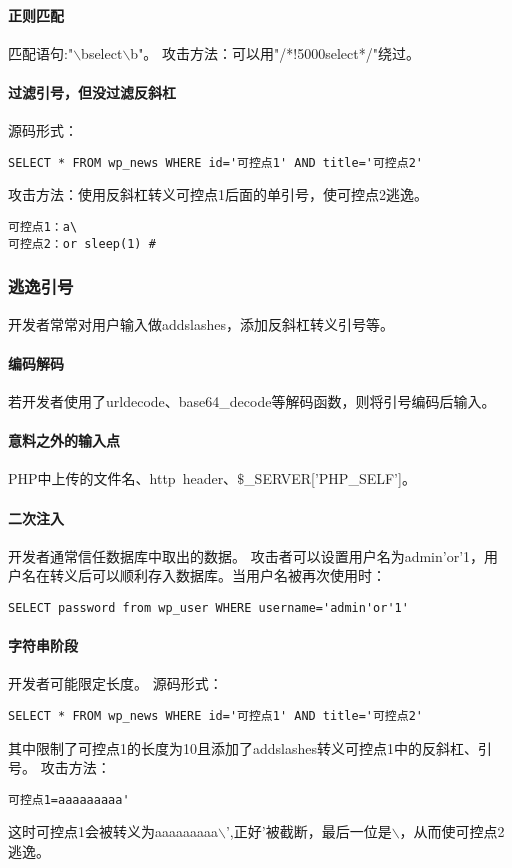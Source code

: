 \paragraph*{正则匹配}
匹配语句:"$\backslash$bselect$\backslash$b"。
攻击方法：可以用"/*!5000select*/"绕过。

\paragraph*{过滤引号，但没过滤反斜杠}
源码形式：
\begin{lstlisting}
SELECT * FROM wp_news WHERE id='可控点1' AND title='可控点2'
\end{lstlisting}
攻击方法：使用反斜杠转义可控点1后面的单引号，使可控点2逃逸。
\begin{lstlisting}
可控点1：a\
可控点2：or sleep(1) #
\end{lstlisting}

\subsubsection*{逃逸引号}
开发者常常对用户输入做addslashes，添加反斜杠转义引号等。

\paragraph*{编码解码}
若开发者使用了urldecode、base64\_decode等解码函数，则将引号编码后输入。

\paragraph*{意料之外的输入点}
PHP中上传的文件名、http\ header、$\$$\_SERVER['PHP\_SELF']。

\paragraph*{二次注入}
开发者通常信任数据库中取出的数据。
攻击者可以设置用户名为admin'or'1，用户名在转义后可以顺利存入数据库。当用户名被再次使用时：
\begin{lstlisting}
SELECT password from wp_user WHERE username='admin'or'1'
\end{lstlisting}

\paragraph*{字符串阶段}
开发者可能限定长度。
源码形式：
\begin{lstlisting}
SELECT * FROM wp_news WHERE id='可控点1' AND title='可控点2'
\end{lstlisting}
其中限制了可控点1的长度为10且添加了addslashes转义可控点1中的反斜杠、引号。
攻击方法：
\begin{lstlisting}
可控点1=aaaaaaaaa'
\end{lstlisting}
这时可控点1会被转义为aaaaaaaaa$\backslash$',正好'被截断，最后一位是$\backslash$，从而使可控点2逃逸。

